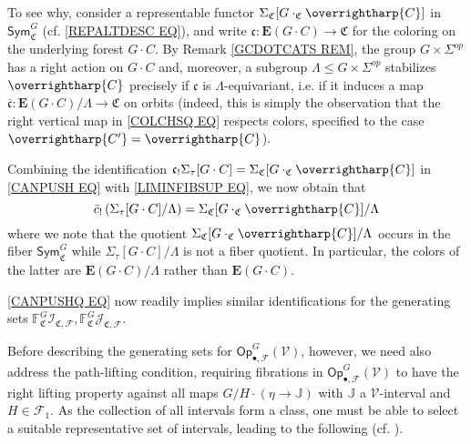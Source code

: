 \documentclass[a4paper,10pt
 ,final
]{article}%
\numberwithin{equation}{section}
\numberwithin{figure}{section}
\theoremstyle{definition} %
\newcommand{\vect}[1]{\text{\overrightharp{\ensuremath{#1}}}}
\newcommand{\F}{\ensuremath{\mathcal F}}
\newcommand{\V}{\ensuremath{\mathcal V}}
\newcommand{\1}{\ensuremath{\mathbbm 1}}%
\begin{document}
To see why, 
consider a representable functor
$\Sigma_{\mathfrak{C}}[G \cdot_{\mathfrak{C}} \vect{C}]$
in
$\mathsf{Sym}^G_{\mathfrak{C}}$
(cf. \eqref{REPALTDESC EQ}),
and write
$\mathfrak{c} \colon 
\boldsymbol{E}(G \cdot C) \to \mathfrak{C}$
for the coloring on the underlying forest $G \cdot C$.
By Remark \ref{GCDOTCATS REM},
the group $G \times \Sigma^{op}$
has a right action on $G \cdot C$ and, 
moreover, a subgroup
$\Lambda \leq G \times \Sigma^{op}$ stabilizes $\vect{C}$
precisely if $\mathfrak{c}$ is $\Lambda$-equivariant,
i.e. if it induces a map 
$\bar{\mathfrak{c}} \colon 
\boldsymbol{E}(G \cdot C)/\Lambda \to \mathfrak{C}$
on orbits
(indeed, this is simply the observation that the right vertical map in 
\eqref{COLCHSQ EQ} respects colors, specified to the case
$\vect{C'} = \vect{C}$).


Combining the identification
$\mathfrak{c}_! \Sigma_{\tau}[G \cdot C]
=
\Sigma_{\mathfrak{C}}[G \cdot_{\mathfrak{C}} \vect{C}]$
in 
\eqref{CANPUSH EQ}
with 
\eqref{LIMINFIBSUP EQ},
we now obtain that
\begin{equation}\label{CANPUSHQ EQ}
\bar{c}_{!} 
\left(
\Sigma_{\tau}[G \cdot C]/\Lambda
\right)
=
\Sigma_{\mathfrak{C}}[G \cdot_{\mathfrak{C}} \vect{C}]/\Lambda
\end{equation}
where we note that the quotient
$\Sigma_{\mathfrak{C}}[G \cdot_{\mathfrak{C}} \vect{C}]/\Lambda$
occurs in the fiber $\mathsf{Sym}^G_{\mathfrak{C}}$
while $\Sigma_{\tau}[G \cdot C]/\Lambda$
is not a fiber quotient.
In particular, the colors of the latter are
$\boldsymbol{E}(G \cdot C)/\Lambda$
rather than $\boldsymbol{E}(G \cdot C)$.

\eqref{CANPUSHQ EQ} now readily implies similar identifications for the generating sets
$\mathbb{F}^G_{\mathfrak{C}} \mathcal{I}_{\mathfrak{C},\mathcal{F}},
\mathbb{F}^G_{\mathfrak{C}} \mathcal{J}_{\mathfrak{C},\mathcal{F}}$.




Before describing the generating sets for 
$\mathsf{Op}^G_{\bullet,\mathcal{F}}(\V)$, however,
we need also address the path-lifting condition, 
requiring fibrations in $\mathsf{Op}^G_{\bullet,\F}(\V)$ to have the right lifting property against all maps 
$G/H \cdot (\eta \to \mathbb J)$
with $\mathbb{J}$ a $\V$-interval and $H \in \F_1$.
As the collection of all intervals form a class, one must be able to select a suitable representative set of intervals, leading to the following (cf. \cite{BM13}).
\end{document}
